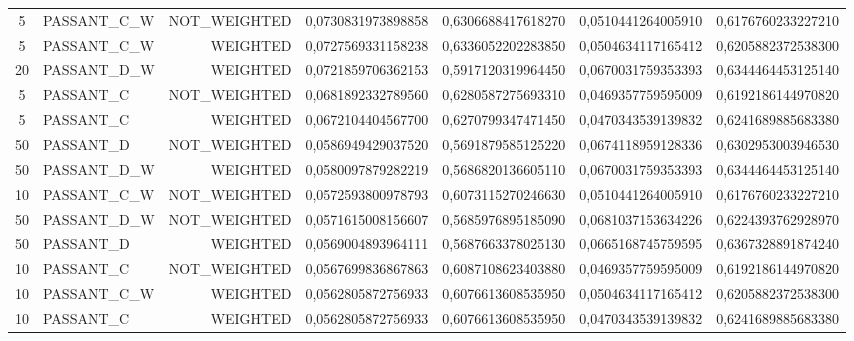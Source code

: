 \begin{table}[H]
{\begin{tabular}{ c l r c c c c }
				5 & PASSANT\_C\_W & NOT\_WEIGHTED & 0,0730831973898858 & 0,6306688417618270 & 0,0510441264005910 & 0,6176760233227210 \\
				
				5 & PASSANT\_C\_W &   WEIGHTED & 0,0727569331158238 & 0,6336052202283850 & 0,0504634117165412 & 0,6205882372538300 \\
				
				20 & PASSANT\_D\_W &   WEIGHTED & 0,0721859706362153 & 0,5917120319964450 & 0,0670031759353393 & 0,6344464453125140 \\
				
				5 &  PASSANT\_C & NOT\_WEIGHTED & 0,0681892332789560 & 0,6280587275693310 & 0,0469357759595009 & 0,6192186144970820 \\
				
				5 &  PASSANT\_C &   WEIGHTED & 0,0672104404567700 & 0,6270799347471450 & 0,0470343539139832 & 0,6241689885683380 \\
				
				50 &  PASSANT\_D & NOT\_WEIGHTED & 0,0586949429037520 & 0,5691879585125220 & 0,0674118959128336 & 0,6302953003946530 \\
				
				50 & PASSANT\_D\_W &   WEIGHTED & 0,0580097879282219 & 0,5686820136605110 & 0,0670031759353393 & 0,6344464453125140 \\
				
				10 & PASSANT\_C\_W & NOT\_WEIGHTED & 0,0572593800978793 & 0,6073115270246630 & 0,0510441264005910 & 0,6176760233227210 \\
				
				50 & PASSANT\_D\_W & NOT\_WEIGHTED & 0,0571615008156607 & 0,5685976895185090 & 0,0681037153634226 & 0,6224393762928970 \\
				
				50 &  PASSANT\_D &   WEIGHTED & 0,0569004893964111 & 0,5687663378025130 & 0,0665168745759595 & 0,6367328891874240 \\
				
				10 &  PASSANT\_C & NOT\_WEIGHTED & 0,0567699836867863 & 0,6087108623403880 & 0,0469357759595009 & 0,6192186144970820 \\
				
				10 & PASSANT\_C\_W &   WEIGHTED & 0,0562805872756933 & 0,6076613608535950 & 0,0504634117165412 & 0,6205882372538300 \\
				
				10 &  PASSANT\_C &   WEIGHTED & 0,0562805872756933 & 0,6076613608535950 & 0,0470343539139832 & 0,6241689885683380 \\
				

\end{tabular}}
\end{table}
